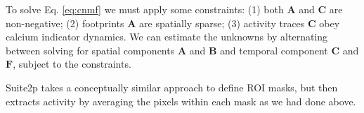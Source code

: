 \documentclass[a4paper]{report}
\begin{document}
To solve Eq. \ref{eq:cnmf} we must apply some constraints: (1) both $\mathbf{A}$ and $\mathbf{C}$ are non-negative; (2) footprints $\mathbf{A}$ are spatially sparse; (3) activity traces $\mathbf{C}$ obey calcium indicator dynamics. We can estimate the unknowns by alternating between solving for spatial components $\mathbf{A}$ and $\mathbf{B}$ and temporal component $\mathbf{C}$ and $\mathbf{F}$, subject to the constraints.

Suite2p takes a conceptually similar approach to define ROI masks, but then extracts activity by averaging the pixels within each mask as we had done above.
\end{document}
